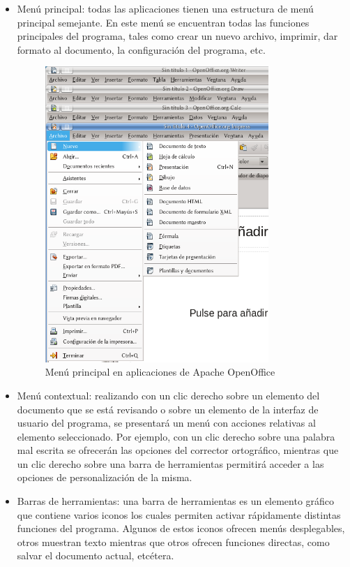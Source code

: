 \documentclass[12pt]{article}
\begin{document}
\begin{itemize}
\item Menú principal: todas las aplicaciones tienen una estructura de menú principal semejante. En este menú se encuentran todas las funciones principales del programa, tales como crear un nuevo archivo, imprimir, dar formato al documento, la configuración del programa, etc.

\begin{figure}[H]
\centering
\includegraphics[width=0.8\textwidth]{menuAppsOO.png}
\renewcommand{\figurename}{Fig.}
\caption{Menú principal en aplicaciones de Apache OpenOffice}
\label{contexto:figura}
\end{figure}

\item Menú contextual: realizando con un clic derecho sobre un elemento del documento que se está revisando o sobre un elemento de la interfaz de usuario del programa, se presentará un menú con acciones relativas al elemento seleccionado. Por ejemplo, con un clic derecho sobre una palabra mal escrita se ofrecerán las opciones del corrector ortográfico, mientras que un clic derecho sobre una barra de herramientas permitirá acceder a las opciones de personalización de la misma.

\item Barras de herramientas: una barra de herramientas es un elemento gráfico que contiene varios iconos los cuales permiten activar rápidamente distintas funciones del programa. Algunos de estos iconos ofrecen menús desplegables, otros muestran texto mientras que otros ofrecen funciones directas, como salvar el documento actual, etcétera.


\end{itemize}
\end{document}
